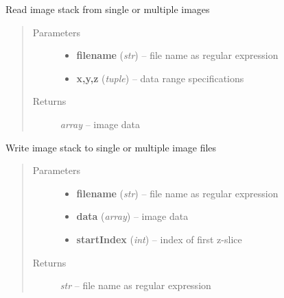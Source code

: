 \documentclass[letterpaper,10pt,english]{sphinxmanual}
\begin{document}

\begin{fulllineitems}
\label{api/ClearMap.IO:ClearMap.IO.FileList.readData}
Read image stack from single or multiple images
\begin{quote}\begin{description}
\item[{Parameters}] \leavevmode\begin{itemize}
\item {} 
\textbf{filename} (\emph{str}) --
file name as regular expression

\item {} 
\textbf{x,y,z} (\emph{tuple}) --
data range specifications

\end{itemize}

\item[{Returns}] \leavevmode
\emph{array} --
image data

\end{description}\end{quote}

\end{fulllineitems}


\begin{fulllineitems}
\label{api/ClearMap.IO:ClearMap.IO.FileList.writeData}
Write image stack to single or multiple image files
\begin{quote}\begin{description}
\item[{Parameters}] \leavevmode\begin{itemize}
\item {} 
\textbf{filename} (\emph{str}) --
file name as regular expression

\item {} 
\textbf{data} (\emph{array}) --
image data

\item {} 
\textbf{startIndex} (\emph{int}) --
index of first z-slice

\end{itemize}

\item[{Returns}] \leavevmode
\emph{str} --
file name as regular expression

\end{description}\end{quote}

\end{fulllineitems}
\end{document}

